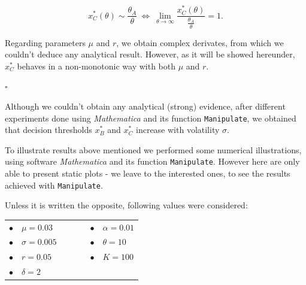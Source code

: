 $$x^*_C(\theta) \sim \frac{\theta_A}{\theta} \ \Leftrightarrow \ \lim_{\theta \to \infty} \frac{x^*_C(\theta)}{\frac{\theta_A}{\theta}}=1.$$

Regarding parameters $\mu$ and $r$, we obtain complex derivates, from which we couldn't deduce any analytical result. However, as it will be showed hereunder, $x^*_C$ behaves in a non-monotonic way with both $\mu$ and $r$.
\begin{flushright}
	$\square$
\end{flushright}


Although we couldn't obtain any analytical (strong) evidence, after different experiments done using \textit{Mathematica} and its function \texttt{Manipulate}, we obtained that decision thresholds $x^*_B$ and $x^*_C$ increase with volatility $\sigma$.



To illustrate results above mentioned we performed some numerical illustrations, using software \textit{Mathematica} and its function \texttt{Manipulate}. However here are only able to present static plots - we leave to the interested ones, to see the results achieved with \texttt{Manipulate}.

Unless it is written the opposite, following values were considered:
\begin{table}[!htb]
	\centering
	\begin{tabular}{lllllll}
		$\bullet$ & $\mu=0.03$     &  & \hspace{7cm} &  &  $\bullet$ & $\alpha=0.01$ \\
		$\bullet$ & $\sigma=0.005$ &  & \hspace{7cm} &  &  $\bullet$ & $\theta=10$   \\
		$\bullet$ & $r=0.05$       &  & \hspace{7cm} &  &  $\bullet$ & $K=100$       \\
		$\bullet$ & $\delta=2$     &  & \hspace{7cm} &  &                                    
	\end{tabular}
\end{table}



